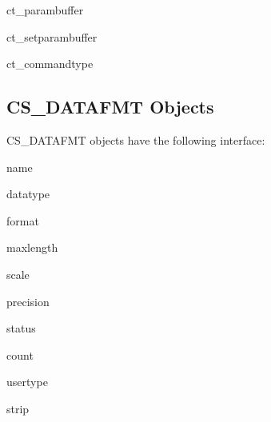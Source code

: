 \begin{methoddesc}[CS_COMMAND]{ct_param}{buffer}
\end{methoddesc}

\begin{methoddesc}[CS_COMMAND]{ct_setparam}{buffer}
\end{methoddesc}

\begin{methoddesc}[CS_COMMAND]{ct_command}{type \optional{, \ldots}}
\end{methoddesc}

\subsection{CS_DATAFMT Objects}

CS_DATAFMT objects have the following interface:

\begin{memberdesc}[CS_DATAFMT]{name}
\end{memberdesc}

\begin{memberdesc}[CS_DATAFMT]{datatype}
\end{memberdesc}

\begin{memberdesc}[CS_DATAFMT]{format}
\end{memberdesc}

\begin{memberdesc}[CS_DATAFMT]{maxlength}
\end{memberdesc}

\begin{memberdesc}[CS_DATAFMT]{scale}
\end{memberdesc}

\begin{memberdesc}[CS_DATAFMT]{precision}
\end{memberdesc}

\begin{memberdesc}[CS_DATAFMT]{status}
\end{memberdesc}

\begin{memberdesc}[CS_DATAFMT]{count}
\end{memberdesc}

\begin{memberdesc}[CS_DATAFMT]{usertype}
\end{memberdesc}

\begin{memberdesc}[CS_DATAFMT]{strip}
\end{memberdesc}

